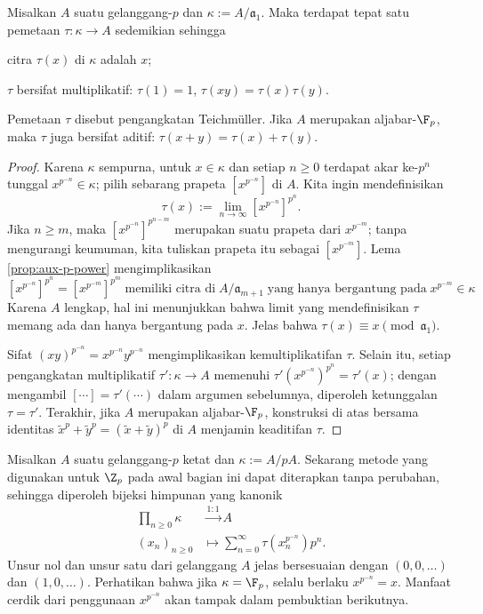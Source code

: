 \begin{proposition}\label{prop:Teichmuller-lift}
	Misalkan $A$ suatu gelanggang-$p$ dan $\kappa := A/\mathfrak{a}_1$. Maka terdapat tepat satu pemetaan $\tau: \kappa \to A$ sedemikian sehingga
	\begin{compactitem}
		\item citra $\tau(x)$ di $\kappa$ adalah $x$;
		\item $\tau$ bersifat multiplikatif: $\tau(1)=1$, $\tau(xy)=\tau(x)\tau(y)$.
	\end{compactitem}
	Pemetaan $\tau$ disebut pengangkatan Teichmüller. Jika $A$ merupakan aljabar-$\F_p$, maka $\tau$ juga bersifat aditif: $\tau(x+y)=\tau(x)+\tau(y)$.
\end{proposition}
\begin{proof}
	Karena $\kappa$ sempurna, untuk $x \in \kappa$ dan setiap $n \geq 0$ terdapat akar ke-$p^n$ tunggal $x^{p^{-n}} \in \kappa$; pilih sebarang prapeta $\left[ x^{p^{-n}} \right]$ di $A$. Kita ingin mendefinisikan
	\[ \tau(x) := \lim_{n \to \infty} \left[ x^{p^{-n}} \right]^{p^n}. \]
	Jika $n \geq m$, maka $\left[ x^{p^{-n}} \right]^{p^{n-m}}$ merupakan suatu prapeta dari $x^{p^{-m}}$; tanpa mengurangi keumuman, kita tuliskan prapeta itu sebagai $\left[ x^{p^{-m}} \right]$. Lema \ref{prop:aux-p-power} mengimplikasikan
	\[ \left[ x^{p^{-n}} \right]^{p^n} = \left[ x^{p^{-m}} \right]^{p^m} \;\text{memiliki citra di}\; A/\mathfrak{a}_{m+1}\; \text{yang hanya bergantung pada}\; x^{p^{-m}} \in \kappa \]
	Karena $A$ lengkap, hal ini menunjukkan bahwa limit yang mendefinisikan $\tau$ memang ada dan hanya bergantung pada $x$. Jelas bahwa $\tau(x) \equiv x \pmod{\mathfrak{a}_1}$.

	Sifat $(xy)^{p^{-n}} = x^{p^{-n}} y^{p^{-n}}$ mengimplikasikan kemultiplikatifan $\tau$. Selain itu, setiap pengangkatan multiplikatif $\tau': \kappa \to A$ memenuhi $\tau'( x^{p^{-n}})^{p^n} = \tau'(x)$; dengan mengambil $\left[ \cdots \right] = \tau'(\cdots)$ dalam argumen sebelumnya, diperoleh ketunggalan $\tau=\tau'$. Terakhir, jika $A$ merupakan aljabar-$\F_p$, konstruksi di atas bersama identitas $\tilde{x}^p + \tilde{y}^p = (\tilde{x}+\tilde{y})^p$ di $A$ menjamin keaditifan $\tau$.
\end{proof}

Misalkan $A$ suatu gelanggang-$p$ ketat dan $\kappa := A/pA$. Sekarang metode yang digunakan untuk $\Z_p$ pada awal bagian ini dapat diterapkan tanpa perubahan, sehingga diperoleh bijeksi himpunan yang kanonik
\begin{equation}\label{eqn:Witt-bijection}\begin{aligned}
	\prod_{n \geq 0} \kappa & \stackrel{1:1}{\longrightarrow} A \\
	(x_n)_{n \geq 0} & \longmapsto \sum_{n=0}^\infty \tau\left( x_n^{p^{-n}} \right) p^n.
\end{aligned}\end{equation}
Unsur nol dan unsur satu dari gelanggang $A$ jelas bersesuaian dengan $(0,0,\ldots)$ dan $(1, 0, \ldots)$. Perhatikan bahwa jika $\kappa = \F_p$, selalu berlaku $x^{p^{-n}} = x$. Manfaat cerdik dari penggunaan $x^{p^{-n}}$ akan tampak dalam pembuktian berikutnya.

